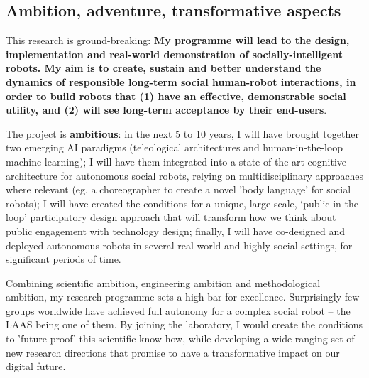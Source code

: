 



\subsection{Ambition, adventure, transformative aspects}

This research is ground-breaking: \textbf{My programme will lead to
the design, implementation and real-world demonstration of 
socially-intelligent robots.  My aim is to create, sustain and better understand
the dynamics of responsible long-term social human-robot interactions, in order
to build robots that (1) have an effective, demonstrable social utility, and (2)
will see long-term acceptance by their end-users}.


The project is \textbf{ambitious}: in the next 5 to 10 years, I will have
brought together two emerging AI paradigms (teleological architectures and
human-in-the-loop machine learning); I will have them integrated into a
state-of-the-art cognitive architecture for autonomous social robots, relying on
multidisciplinary approaches where relevant (eg. a choreographer to create a
novel 'body language' for social robots); I will have created the conditions for
a unique, large-scale, `public-in-the-loop' participatory design approach that
will transform how we think about public engagement with technology design;
finally, I will have co-designed and deployed autonomous robots in several
real-world and highly social settings, for significant periods of time.

Combining scientific ambition, engineering ambition and methodological ambition,
my research programme sets a high bar for excellence.  Surprisingly few groups
worldwide have achieved full autonomy for a complex social robot -- the LAAS
being one of them. By joining the laboratory, I would create the conditions to
'future-proof' this scientific know-how, while developing a wide-ranging set of
new research directions that promise to have a transformative impact on our
digital future.

